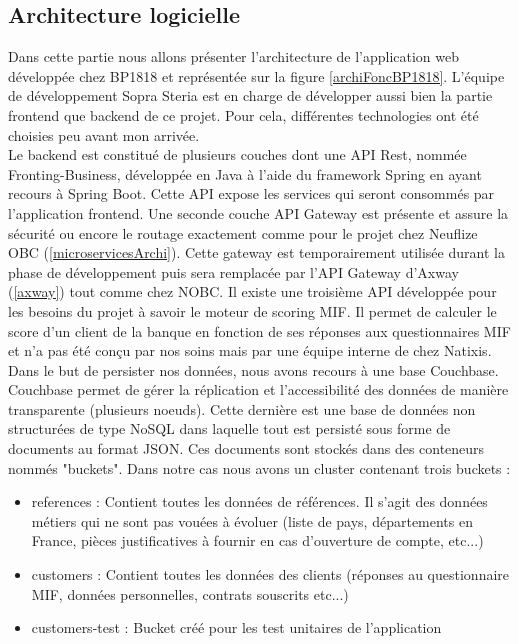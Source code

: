 \subsection{Architecture logicielle}
\label{archiBP1818}

	Dans cette partie nous allons présenter l'architecture de l'application web développée chez BP1818 et représentée sur la figure \ref{archiFoncBP1818}. L'équipe de développement Sopra Steria est en charge de développer aussi bien la partie frontend que backend de ce projet. Pour cela, différentes technologies ont été choisies peu avant mon arrivée. \\
	
	Le backend est constitué de plusieurs couches dont une API Rest, nommée Fronting-Business, développée en Java à l'aide du framework Spring en ayant recours à Spring Boot. Cette API expose les services qui seront consommés par l'application frontend. Une seconde couche API Gateway est présente et assure la sécurité ou encore le routage exactement comme pour le projet chez Neuflize OBC (\ref{microservicesArchi}). Cette gateway est temporairement utilisée durant la phase de développement puis sera remplacée par l'API Gateway d'Axway (\ref{axway}) tout comme chez NOBC. Il existe une troisième API développée pour les besoins du projet à savoir le moteur de scoring MIF. Il permet de calculer le score d'un client de la banque en fonction de ses réponses aux questionnaires MIF et n'a pas été conçu par nos soins mais par une équipe interne de chez Natixis. \\
	
	Dans le but de persister nos données, nous avons recours à une base Couchbase. Couchbase permet de gérer la réplication et l'accessibilité des données de manière transparente (plusieurs noeuds). Cette dernière est une base de données non structurées de type NoSQL dans laquelle tout est persisté sous forme de documents au format JSON. Ces documents sont stockés dans des conteneurs nommés "buckets". Dans notre cas nous avons un cluster contenant trois buckets :
	\begin{itemize}
		\item references : Contient toutes les données de références. Il s'agit des données métiers qui ne sont pas vouées à évoluer (liste de pays, départements en France, pièces justificatives à fournir en cas d'ouverture de compte, etc...)
		\item customers : Contient toutes les données des clients (réponses au questionnaire MIF, données personnelles, contrats souscrits etc...)
		\item customers-test : Bucket créé pour les test unitaires de l'application \\
	\end{itemize}
	
